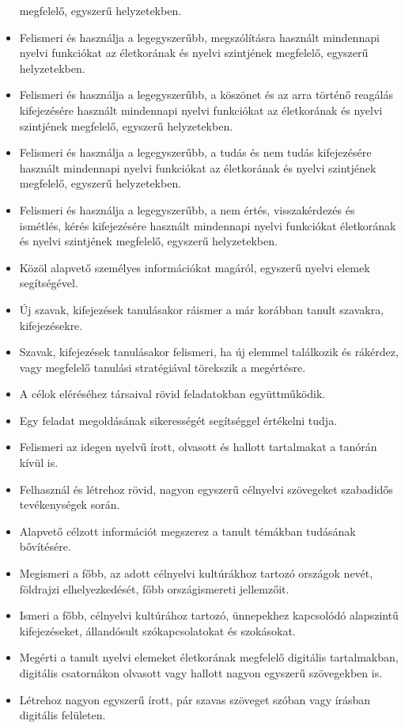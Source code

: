 \begin{itemize}
  megfelelő, egyszerű helyzetekben.
\item
  Felismeri és használja a legegyszerűbb, megszólításra használt
  mindennapi nyelvi funkciókat az életkorának és nyelvi szintjének
  megfelelő, egyszerű helyzetekben.
\item
  Felismeri és használja a legegyszerűbb, a köszönet és az arra történő
  reagálás kifejezésére használt mindennapi nyelvi funkciókat az
  életkorának és nyelvi szintjének megfelelő, egyszerű helyzetekben.
\item
  Felismeri és használja a legegyszerűbb, a tudás és nem tudás
  kifejezésére használt mindennapi nyelvi funkciókat az életkorának és
  nyelvi szintjének megfelelő, egyszerű helyzetekben.
\item
  Felismeri és használja a legegyszerűbb, a nem értés, visszakérdezés és
  ismétlés, kérés kifejezésére használt mindennapi nyelvi funkciókat
  életkorának és nyelvi szintjének megfelelő, egyszerű helyzetekben.
\item
  Közöl alapvető személyes információkat magáról, egyszerű nyelvi elemek
  segítségével.
\item
  Új szavak, kifejezések tanulásakor ráismer a már korábban tanult
  szavakra, kifejezésekre.
\item
  Szavak, kifejezések tanulásakor felismeri, ha új elemmel találkozik és
  rákérdez, vagy megfelelő tanulási stratégiával törekszik a megértésre.
\item
  A célok eléréséhez társaival rövid feladatokban együttműködik.
\item
  Egy feladat megoldásának sikerességét segítséggel értékelni tudja.
\item
  Felismeri az idegen nyelvű írott, olvasott és hallott tartalmakat a
  tanórán kívül is.
\item
  Felhasznál és létrehoz rövid, nagyon egyszerű célnyelvi szövegeket
  szabadidős tevékenységek során.
\item
  Alapvető célzott információt megszerez a tanult témákban tudásának
  bővítésére.
\item
  Megismeri a főbb, az adott célnyelvi kultúrákhoz tartozó országok
  nevét, földrajzi elhelyezkedését, főbb országismereti jellemzőit.
\item
  Ismeri a főbb, célnyelvi kultúrához tartozó, ünnepekhez kapcsolódó
  alapszintű kifejezéseket, állandósult szókapcsolatokat és szokásokat.
\item
  Megérti a tanult nyelvi elemeket életkorának megfelelő digitális
  tartalmakban, digitális csatornákon olvasott vagy hallott nagyon
  egyszerű szövegekben is.
\item
  Létrehoz nagyon egyszerű írott, pár szavas szöveget szóban vagy
  írásban digitális felületen.
\end{itemize}

